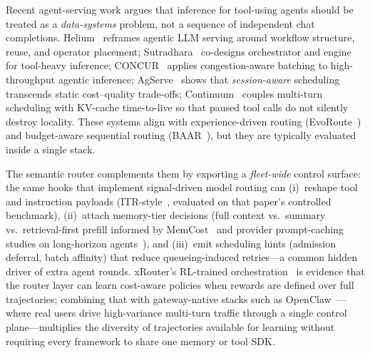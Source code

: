 Recent agent-serving work argues that inference for tool-using agents
should be treated as a \emph{data-systems} problem, not a sequence of
independent chat completions.  Helium~\cite{helium2026} reframes
agentic LLM serving around workflow structure, reuse, and operator
placement; Sutradhara~\cite{sutradhara2026} co-designs orchestrator
and engine for tool-heavy inference; CONCUR~\cite{concur2026}
applies congestion-aware batching to high-throughput agentic
inference; AgServe~\cite{agserve2025} shows that
\emph{session-aware} scheduling transcends static cost--quality
trade-offs; Continuum~\cite{continuum2025} couples multi-turn
scheduling with KV-cache time-to-live so that paused tool calls do
not silently destroy locality.  These systems align with
experience-driven routing (EvoRoute~\cite{evoroute2026}) and
budget-aware sequential routing (BAAR~\cite{baar2026}), but they are
typically evaluated inside a single stack.

The semantic router complements them by exporting a \emph{fleet-wide}
control surface: the same hooks that implement signal-driven model
routing can (i)~reshape tool and instruction payloads
(ITR-style~\cite{itr2026}, evaluated on that paper's controlled
benchmark), (ii)~attach memory-tier decisions (full
context vs.\ summary vs.\ retrieval-first prefill informed by
MemCost~\cite{memcost2026} and provider prompt-caching studies on
long-horizon agents~\cite{dontbreakcache2026}), and (iii)~emit scheduling hints
(admission deferral, batch affinity) that reduce queueing-induced
retries---a common hidden driver of extra agent rounds.  xRouter's
RL-trained orchestration~\cite{xrouter2025} is evidence that the
router layer can learn cost-aware policies when rewards are defined
over full trajectories; combining that with gateway-native stacks
such as OpenClaw~\cite{openclaw2026}---where real users drive
high-variance multi-turn traffic through a single control
plane---multiplies the diversity of trajectories available for
learning without requiring every framework to share one memory or
tool SDK.


